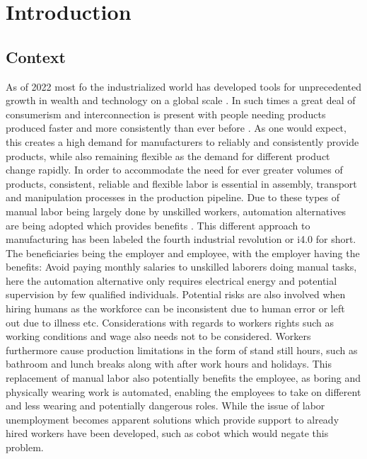 \chapter{Introduction}\label{ch:intro}

\section{Context}\label{sec:intro-context}

As of 2022 most fo the industrialized world has developed tools for unprecedented growth in wealth and technology on a global scale \cite[Chapter 4]{technology-and-inequalities}. In such times a great deal of consumerism and interconnection is present with people needing products produced faster and more consistently than ever before \cite[Chapter 4]{technology-and-inequalities}. 
As one would expect, this creates a high demand for manufacturers to reliably and consistently provide products, while also remaining flexible as the demand for different product change rapidly. 
In order to accommodate the need for ever greater volumes of products, consistent, reliable and flexible labor is essential in assembly, transport and manipulation processes in the production pipeline. Due to these types of manual labor being largely done by unskilled workers, automation alternatives are being adopted which provides benefits \cite[Chapter 4]{technology-and-inequalities}. This different approach to manufacturing has been labeled the fourth industrial revolution or i4.0 for short.
The beneficiaries being the employer and employee, with the employer having the benefits: Avoid paying monthly salaries to unskilled laborers doing manual tasks, here the automation alternative only requires electrical energy and potential supervision by few qualified individuals. Potential risks are also involved when hiring humans as the workforce can be inconsistent due to human error \cite{analysis-and-control-of-human-error} or left out due to illness etc. Considerations with regards to workers rights such as working conditions and wage also needs not to be considered. Workers furthermore cause production limitations in the form of stand still hours, such as bathroom and lunch breaks along with after work hours and holidays.
This replacement of manual labor also potentially benefits the employee, as boring and physically wearing work is automated, enabling the employees to take on different and less wearing and potentially dangerous roles. While the issue of labor unemployment becomes apparent solutions which provide support to already hired workers have been developed, such as \gls{cobot}\cite*{cobots-and-the-benefits-of-their-implementation-in-intelligent-manufacturing} which would negate this problem. \medskip

